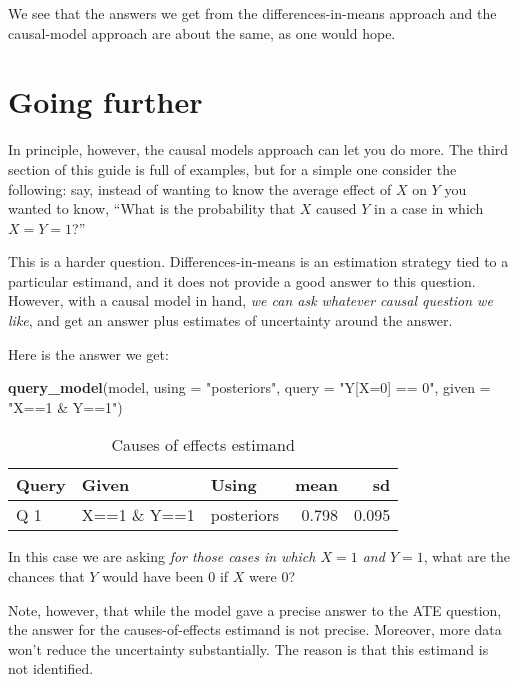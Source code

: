 \documentclass[
  12pt,
]{book}
\newenvironment{Shaded}{\begin{snugshade}}{\end{snugshade}}
\newcommand{\DataTypeTok}[1]{\textcolor[rgb]{0.13,0.29,0.53}{#1}}
\newcommand{\KeywordTok}[1]{\textcolor[rgb]{0.13,0.29,0.53}{\textbf{#1}}}
\newcommand{\NormalTok}[1]{#1}
\newcommand{\StringTok}[1]{\textcolor[rgb]{0.31,0.60,0.02}{#1}}
\begin{document}
We see that the answers we get from the differences-in-means approach and the causal-model approach are about the same, as one would hope.

\hypertarget{going-further}{%
\section{Going further}\label{going-further}}

In principle, however, the causal models approach can let you do more. The third section of this guide is full of examples, but for a simple one consider the following: say, instead of wanting to know the average effect of \(X\) on \(Y\) you wanted to know, ``What is the probability that \(X\) caused \(Y\) in a case in which \(X=Y=1\)?''

This is a harder question. Differences-in-means is an estimation strategy tied to a particular estimand, and it does not provide a good answer to this question. However, with a causal model in hand, \emph{we can ask whatever causal question we like}, and get an answer plus estimates of uncertainty around the answer.

Here is the answer we get:

\begin{Shaded}
\begin{Highlighting}[]
\KeywordTok{query_model}\NormalTok{(model, }
            \DataTypeTok{using =} \StringTok{"posteriors"}\NormalTok{, }
            \DataTypeTok{query =} \StringTok{"Y[X=0] == 0"}\NormalTok{,}
            \DataTypeTok{given =} \StringTok{"X==1 & Y==1"}\NormalTok{)  }
\end{Highlighting}
\end{Shaded}

\begin{table}

\caption{\label{tab:unnamed-chunk-11}Causes of effects estimand}
\centering
\begin{tabular}[t]{l|l|l|r|r}
\hline
Query & Given & Using & mean & sd\\
\hline
Q 1 & X==1 \& Y==1 & posteriors & 0.798 & 0.095\\
\hline
\end{tabular}
\end{table}

In this case we are asking \emph{for those cases in which \(X=1\) and \(Y=1\)}, what are the chances that \(Y\) would have been \(0\) if \(X\) were \(0\)?

Note, however, that while the model gave a precise answer to the ATE question, the answer for the causes-of-effects estimand is not precise. Moreover, more data won't reduce the uncertainty substantially. The reason is that this estimand is not identified.
\end{document}
